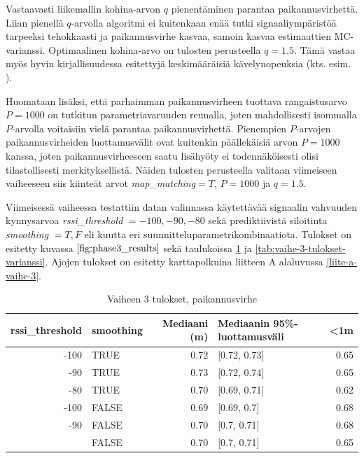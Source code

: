 \documentclass[
  12pt,
  a4paper, twoside]{book}
\begin{document}
Vastaavasti liikemallin kohina-arvon \(q\) pienentäminen parantaa paikannusvirhettä. Liian pienellä \(q\)-arvolla algoritmi ei kuitenkaan enää tutki signaaliympäristöä tarpeeksi tehokkaasti ja paikannusvirhe kasvaa, samoin kasvaa estimaattien MC-varianssi. Optimaalinen kohina-arvo on tulosten perusteella \(q=1.5\). Tämä vastaa myös hyvin kirjallisuudessa esitettyjä keskimääräisiä kävelynopeuksia (kts. esim. \citep{Ho-2016}).

Huomataan lisäksi, että parhaimman paikannusvirheen tuottava rangaistusarvo \(P=1000\) on tutkitun parametriavaruuden reunalla, joten mahdollisesti isommalla \(P\)-arvolla voitaisiin vielä parantaa paikannusvirhettä. Pienempien \(P\)-arvojen paikannusvirheiden luottamusvälit ovat kuitenkin päällekäisiä arvon \(P=1000\) kanssa, joten paikannusvirheeseen saatu lisähyöty ei todennäköisesti olisi tilastollisesti merkityksellistä. Näiden tulosten perusteella valitaan viimeiseen vaiheeseen siis kiinteät arvot \emph{map\_matching}\(=T\), \(P=1000\) ja \(q=1.5\).

Viimeisessä vaiheessa testattiin datan valinnassa käytettävää signaalin vahvuuden kynnysarvoa \emph{rssi\_threshold} \(={-100,-90,-80}\) sekä prediktiivistä siloitinta \emph{smoothing} \(={T,F}\) eli kuutta eri suunnitteluparametrikombinaatiota. Tulokset on esitetty kuvassa \(\ref{fig:phase3_results}\) sekä taulukoissa \ref{tab:vaihe-3-tulokset} ja \ref{tab:vaihe-3-tulokset-varianssi}. Ajojen tulokset on esitetty karttapolkuina liitteen A alaluvussa \ref{liite-a-vaihe-3}.

\begin{table}

\caption{\label{tab:vaihe-3-tulokset}Vaiheen 3 tulokset, paikannusvirhe}
\centering
\begin{tabular}[t]{rlrlr}
\toprule
rssi\_threshold & smoothing & Mediaani (m) & Mediaanin 95\%-luottamusväli & <1m\\
\midrule
-100 & TRUE & 0.72 & {}[0.72, 0.73] & 0.65\\
-90 & TRUE & 0.73 & {}[0.72, 0.74] & 0.65\\
-80 & TRUE & 0.70 & {}[0.69, 0.71] & 0.62\\
-100 & FALSE & 0.69 & {}[0.69, 0.7] & 0.68\\
-90 & FALSE & 0.70 & {}[0.7, 0.71] & 0.68\\
\addlinespace
-80 & FALSE & 0.70 & {}[0.7, 0.71] & 0.65\\
\bottomrule
\end{tabular}
\end{table}
\end{document}
